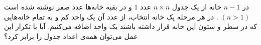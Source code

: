 \EXERCISE
در 
$n-1$
 خانه‌ از یک جدول 
   $n \times n$
   عدد $1$ و در بقیه خانه‌ها عدد صفر نوشته شده است
   $( n > 1)$
   . در هر مرحله یک خانه انتخاب، 
   از عدد آن یک واحد کم و به تمام خانه‌هایی که در سطر و ستون این خانه قرار داشته باشند یک واحد اضافه می‌کنیم. آیا با تکرار این عمل می‌توان همه‌ی اعداد جدول را برابر کرد؟